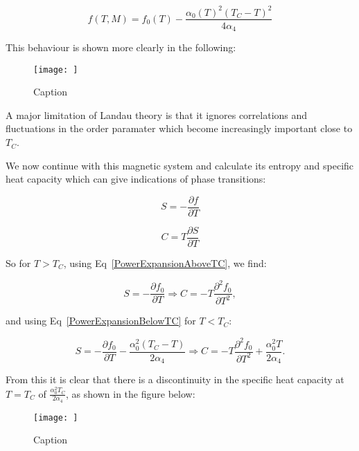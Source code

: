\begin{equation}
    f(T, M) = f_0(T) - \frac{\alpha_0(T)^2 (T_C - T)^2}{4\alpha_4}
    \label{PowerExpansionBelowTC}
\end{equation}

\noindent This behaviour is shown more clearly in the following:

\begin{figure}
    \centering
    \texttt{[image: ]}
    \caption{Caption}
    \label{fig:enter-label}
\end{figure}

\noindent A major limitation of Landau theory is that it ignores correlations and fluctuations in the order paramater which become increasingly important close to $T_C$.

\noindent We now continue with this magnetic system and calculate its entropy and specific heat capacity which can give indications of phase transitions:

\begin{equation}
    S = - \frac{\partial f}{\partial T}
    \label{Entropy}
\end{equation}

\begin{equation}
    C = T \frac{\partial S}{\partial T}
    \label{SpecificHeatCapacity}
\end{equation}

\noindent So for $T > T_C$, using Eq~\ref{PowerExpansionAboveTC}, we find:

\begin{equation}
    S = -\frac{\partial f_0}{\partial T} \Rightarrow C = -T\frac{\partial^2 f_0}{\partial T^2},
    \label{EntropySpecificHeatAboveTC}
\end{equation}

\noindent and using Eq~\ref{PowerExpansionBelowTC} for $T < T_C$:

\begin{equation}
    S = -\frac{\partial f_0}{\partial T} - \frac{\alpha_0^2(T_C - T)}{2\alpha_4} \Rightarrow C = -T\frac{\partial^2 f_0}{\partial T^2} + \frac{\alpha_0^2 T}{2\alpha_4}.
    \label{EntropySpecificHeatBelowTC}
\end{equation}

\noindent From this it is clear that there is a discontinuity in the specific heat capacity at $T = T_C$ of $\frac{\alpha_0^2 T_C}{2\alpha_4}$, as shown in the figure below:

\begin{figure}
    \centering
    \texttt{[image: ]}
    \caption{Caption}
    \label{fig:enter-label}
\end{figure}

